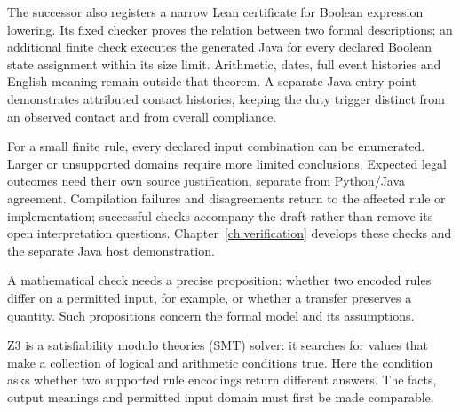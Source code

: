 The successor also registers a narrow Lean certificate for Boolean expression
lowering. Its fixed checker proves the relation between two formal descriptions;
an additional finite check executes the generated Java for every declared
Boolean state assignment within its size limit. Arithmetic, dates, full event
histories and English meaning remain outside that theorem. A separate Java
entry point demonstrates attributed contact histories, keeping the duty trigger
distinct from an observed contact and from overall compliance.

\begin{MapDiagram}
\end{MapDiagram}

For a small finite rule, every declared input combination can be enumerated.
Larger or unsupported domains require more limited conclusions. Expected legal
outcomes need their own source justification, separate from Python/Java
agreement. Compilation failures and disagreements return to the affected rule
or implementation; successful checks accompany the draft rather than remove
its open interpretation questions. Chapter~\ref{ch:verification} develops
these checks and the separate Java host demonstration.

\clearpage
{}
A mathematical check needs a precise proposition: whether two encoded rules
differ on a permitted input, for example, or whether a transfer preserves a
quantity. Such propositions concern the formal model and its assumptions.

Z3 is a satisfiability modulo theories (SMT) solver: it searches for values that
make a collection of logical and arithmetic conditions true. Here the condition
asks whether two supported rule encodings return different answers. The facts,
output meanings and permitted input domain must first be made comparable.


